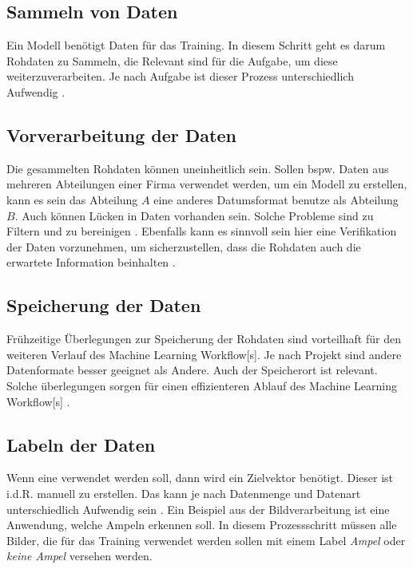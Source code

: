 \subsection{Sammeln von Daten} \label{sec:Worflow DatSam}
Ein Modell benötigt Daten für das Training. In diesem Schritt geht es darum Rohdaten zu Sammeln, die Relevant sind für die Aufgabe, um diese weiterzuverarbeiten. Je nach Aufgabe ist dieser Prozess unterschiedlich Aufwendig \cite{Biswas.2022, Elshawi.2019}.

\subsection{Vorverarbeitung der Daten}
Die gesammelten Rohdaten können uneinheitlich sein. Sollen bspw. Daten aus mehreren Abteilungen einer Firma verwendet werden, um ein Modell zu erstellen, kann es sein das Abteilung \(A\) eine anderes Datumsformat benutze als Abteilung \(B\). Auch können Lücken in Daten vorhanden sein. Solche Probleme sind zu Filtern und zu bereinigen \cite{Biswas.2022, Elshawi.2019}. Ebenfalls kann es sinnvoll sein hier eine Verifikation der Daten vorzunehmen, um sicherzustellen, dass die Rohdaten auch die erwartete Information beinhalten \cite{Shearer.2000}.

\subsection{Speicherung der Daten}
Frühzeitige Überlegungen zur Speicherung der Rohdaten sind vorteilhaft für den weiteren Verlauf des \gls{Machine Learning Workflow}[s]. Je nach Projekt sind andere Datenformate besser geeignet als Andere. Auch der Speicherort ist relevant. Solche überlegungen sorgen für einen effizienteren Ablauf des \gls{Machine Learning Workflow}[s] \cite{Biswas.2022}.

\subsection{Labeln der Daten}
Wenn eine  verwendet werden soll, dann wird ein \gls{Zielvektor} benötigt. Dieser ist i.d.R. manuell zu erstellen. Das kann je nach Datenmenge und Datenart unterschiedlich Aufwendig sein \cite{Biswas.2022}. Ein Beispiel aus der Bildverarbeitung ist eine Anwendung, welche Ampeln erkennen soll. In diesem Prozessschritt müssen alle Bilder, die für das Training verwendet werden sollen mit einem \gls{Label} \textit{Ampel} oder \textit{keine Ampel} versehen werden. 

